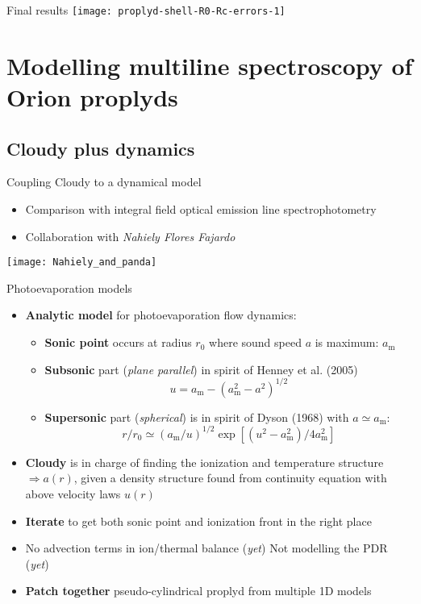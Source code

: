 \documentclass[presentation]{beamer}
\begin{document}
\begin{frame}{Final results}
  \texttt{[image: proplyd-shell-R0-Rc-errors-1]}
\end{frame}


\section{Modelling multiline spectroscopy of Orion proplyds}

\subsection{Cloudy plus dynamics}
\begin{frame}{Coupling Cloudy to a dynamical model}
  \begin{itemize}
  \item Comparison with integral field optical emission line spectrophotometry
  \item Collaboration with \textit{Nahiely Flores Fajardo}
  \end{itemize}
  \bigskip
  \begin{center}
    \texttt{[image: Nahiely\_and\_panda]}
  \end{center}
\end{frame}

\newcommand\Max{_{\mathrm{m}}}
\begin{frame}{Photoevaporation models}
  \begin{itemize}
  \item \textbf{Analytic model} for photoevaporation flow dynamics:
    \begin{itemize}
    \item \textbf{Sonic point} occurs at radius \(r_0\) where sound speed \(a\) is maximum: \(a\Max\)
    \item \textbf{Subsonic} part (\textit{plane parallel}) in spirit of Henney et al.\@
      (2005)
      \[ u = a\Max - (a\Max^2 - a^2)^{1/2} \]
    \item \textbf{Supersonic} part (\textit{spherical}) is in spirit of Dyson
      (1968) with \(a \simeq a\Max\):
      \[ r / r_0 \simeq (a\Max/u)^{1/2} \exp\left[ \left(u^2 - a\Max^2\right)/ 4 a\Max^2 \right] \] 
    \end{itemize}
  \item \textbf{Cloudy} is in charge of finding the ionization and temperature
    structure \(\Rightarrow a(r)\), given a density structure found from continuity equation with above velocity laws \(u(r)\)
  \item \textbf{Iterate} to get both sonic point and ionization front in the right place
  \item {\tiny No advection terms in ion/thermal balance (\textit{yet}) \quad Not modelling the PDR (\textit{yet})}
  \item \textbf{Patch together} pseudo-cylindrical proplyd from multiple 1D models
  \end{itemize}
\end{frame}
\end{document}
